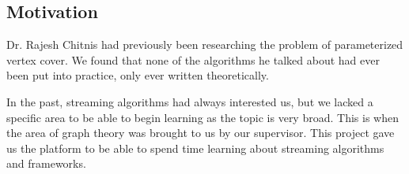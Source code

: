 \subsection{Motivation}

Dr. Rajesh Chitnis had previously been researching the problem of parameterized
vertex cover. We found that none of the algorithms he talked about had ever been
put into practice, only ever written theoretically.

In the past, streaming algorithms had always interested us, but we lacked a
specific area to be able to begin learning as the topic is very broad. This is
when the area of graph theory was brought to us by our supervisor. This project
gave us the platform to be able to spend time learning about streaming
algorithms and frameworks.
